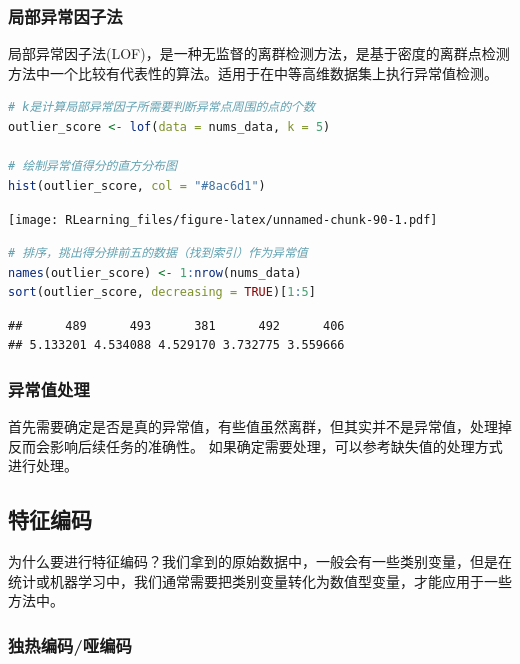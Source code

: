 \documentclass[]{ctexbook}
\begin{document}
\hypertarget{ux5c40ux90e8ux5f02ux5e38ux56e0ux5b50ux6cd5}{%
\subsubsection{局部异常因子法}\label{ux5c40ux90e8ux5f02ux5e38ux56e0ux5b50ux6cd5}}

局部异常因子法(LOF)，是一种无监督的离群检测方法，是基于密度的离群点检测方法中一个比较有代表性的算法。适用于在中等高维数据集上执行异常值检测。

\begin{lstlisting}[language=R]
# k是计算局部异常因子所需要判断异常点周围的点的个数
outlier_score <- lof(data = nums_data, k = 5)

# 绘制异常值得分的直方分布图
hist(outlier_score, col = "#8ac6d1")
\end{lstlisting}

\texttt{[image: RLearning\_files/figure-latex/unnamed-chunk-90-1.pdf]}

\begin{lstlisting}[language=R]
# 排序，挑出得分排前五的数据（找到索引）作为异常值
names(outlier_score) <- 1:nrow(nums_data)
sort(outlier_score, decreasing = TRUE)[1:5]
\end{lstlisting}

\begin{lstlisting}
##      489      493      381      492      406 
## 5.133201 4.534088 4.529170 3.732775 3.559666
\end{lstlisting}

\hypertarget{ux5f02ux5e38ux503cux5904ux7406}{%
\subsubsection{异常值处理}\label{ux5f02ux5e38ux503cux5904ux7406}}

首先需要确定是否是真的异常值，有些值虽然离群，但其实并不是异常值，处理掉反而会影响后续任务的准确性。 如果确定需要处理，可以参考缺失值的处理方式进行处理。

\hypertarget{ux7279ux5f81ux7f16ux7801}{%
\subsection{特征编码}\label{ux7279ux5f81ux7f16ux7801}}

为什么要进行特征编码？我们拿到的原始数据中，一般会有一些类别变量，但是在统计或机器学习中，我们通常需要把类别变量转化为数值型变量，才能应用于一些方法中。

\hypertarget{ux72ecux70edux7f16ux7801ux54d1ux7f16ux7801}{%
\subsubsection{独热编码/哑编码}\label{ux72ecux70edux7f16ux7801ux54d1ux7f16ux7801}}
\end{document}
